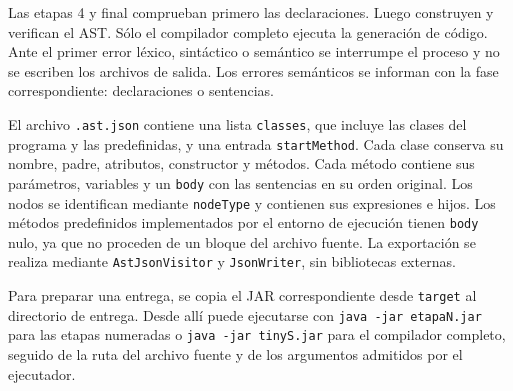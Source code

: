 Las etapas 4 y final comprueban primero las declaraciones. Luego construyen
y verifican el AST. Sólo el compilador completo ejecuta la generación de
código. Ante el primer error léxico, sintáctico o semántico se interrumpe el
proceso y no se escriben los archivos de salida. Los errores semánticos se
informan con la fase correspondiente: declaraciones o sentencias.

El archivo \texttt{.ast.json} contiene una lista \texttt{classes}, que
incluye las clases del programa y las predefinidas, y una entrada
\texttt{startMethod}. Cada clase conserva su nombre, padre, atributos,
constructor y métodos. Cada método contiene sus parámetros, variables y
un \texttt{body} con las sentencias en su orden original. Los nodos se
identifican mediante \texttt{nodeType} y contienen sus expresiones e hijos.
Los métodos predefinidos implementados por el entorno de ejecución tienen
\texttt{body} nulo, ya que no proceden de un bloque del archivo fuente.
La exportación se realiza mediante \texttt{AstJsonVisitor} y
\texttt{JsonWriter}, sin bibliotecas externas.

Para preparar una entrega, se copia el JAR correspondiente desde
\texttt{target} al directorio de entrega. Desde allí puede ejecutarse con
\texttt{java -jar etapaN.jar} para las etapas numeradas o
\texttt{java -jar tinyS.jar} para el compilador completo, seguido de la ruta
del archivo fuente y de los argumentos admitidos por el ejecutador.
